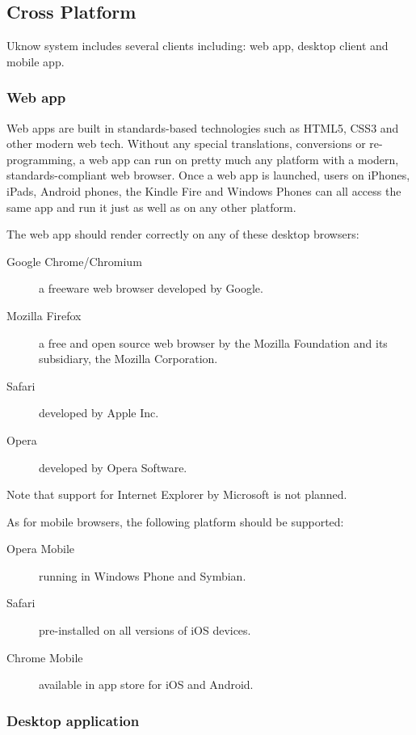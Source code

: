 
\subsection{Cross Platform}

Uknow system includes several clients including: web app, desktop client and mobile app.

\subsubsection{Web app}

Web apps are built in standards-based technologies such as HTML5, 
CSS3 and other modern web tech.  Without any special translations, 
conversions or re-programming, a web app can run on pretty much any platform with a modern, 
standards-compliant web browser. Once a web app is launched, users on iPhones, iPads, Android phones, 
the Kindle Fire and Windows Phones can all access the same app and run it just as well as on any other platform.

The web app should render correctly on any of these desktop browsers:

\begin{description}
\item[Google Chrome/Chromium] a freeware web browser developed by Google.
\item[Mozilla Firefox] a free and open source web browser by the Mozilla Foundation and its subsidiary, the Mozilla Corporation.
\item[Safari] developed by Apple Inc.
\item[Opera] developed by Opera Software.
\end{description}

Note that support for Internet Explorer by Microsoft is not planned.

As for mobile browsers, the following platform should be supported:

\begin{description}
\item[Opera Mobile] running in Windows Phone and Symbian.
\item[Safari] pre-installed on all versions of iOS devices.
\item[Chrome Mobile] available in app store for iOS and Android.
\end{description}

\subsubsection{Desktop application}


